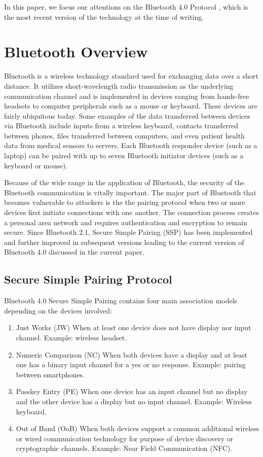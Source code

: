 \documentclass{acm_proc_article-sp}
\begin{document}
In this paper, we focus our attentions on the Bluetooth 4.0 Protocol \cite{bluetooth:sig4}, which is the most recent version of the technology at the time of writing.


\section{Bluetooth Overview}
Bluetooth is a wireless technology standard used for exchanging data over a short distance. It utilizes short-wavelength radio transmission as the underlying communication channel and is implemented in devices ranging from hands-free headsets to computer peripherals such as a mouse or keyboard. These devices are fairly ubiquitous today. Some examples of the data transferred between devices via Bluetooth include inputs from a wireless keyboard, contacts transferred between phones, files transferred between computers, and even patient health data from medical sensors to servers. Each Bluetooth responder device (such as a laptop) can be paired with up to seven Bluetooth initiator devices (such as a keyboard or mouse).

Because of the wide range in the application of Bluetooth, the security of the Bluetooth communication is vitally important. The major part of Bluetooth that becomes vulnerable to attackers is the the pairing protocol when two or more devices first initiate connections with one another. The connection process creates a personal area network and requires authentication and encryption to remain secure. Since Bluetooth 2.1, Secure Simple Pairing (SSP) \cite{bluetooth:sig2} has been implemented and further improved in subsequent versions leading to the current version of Bluetooth 4.0 discussed in the current paper.

\subsection{Secure Simple Pairing Protocol}

Bluetooth 4.0 Secure Simple Pairing contains four main association models depending on the devices involved:
\begin{enumerate}[1.]
    \item{Just Works (JW)} When at least one device does not have display nor input channel. Example: wireless headset.
    \item{Numeric Comparison (NC)} When both devices have a display and at least one has a binary input channel for a yes or no response. Example: pairing between smartphones.
    \item{Passkey Entry (PE)} When one device has an input channel but no display and the other device has a display but no input channel. Example: Wireless keyboard.
    \item{Out of Band (OoB)} When both devices support a common additional wireless or wired communication technology for purpose of device discovery or cryptographic channels. Example: Near Field Communication (NFC).
\end{enumerate}
\end{document}

